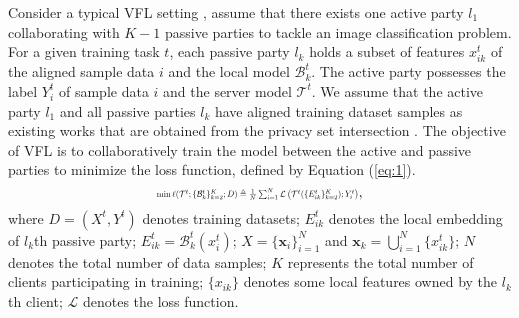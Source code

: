 Consider a typical VFL setting \cite{romanini2021pyvertical,liu2024vertical}, assume that there exists one active party $l_1$ collaborating with $K-1$ passive parties to tackle an image classification problem.
For a given training task $t$, each passive party $l_k$ holds a subset of features $x_{ik}^t$ of the aligned sample data $i$ and the local model $ \mathcal{B}_k^t$. 
The active party possesses the label $Y_{i}^{t}$ of sample data $i$ and the server model $\mathcal{T}^t$. 
We assume that the active party $l_1$ and all passive parties $l_k$ have aligned training dataset samples as existing works that are obtained from the privacy set intersection \cite{luo2021feature,zhang2022adaptive}.
The objective of VFL is to collaboratively train the model between the active and passive parties to minimize the loss function, defined by Equation (\ref{eq:1}).
%
%
\begin{equation} \label{eq:1}
\resizebox{0.42\textwidth}{!}{$
    \min\ell(\mathcal{T}^t; \{\mathcal{B}_k^t\}_{k = 2}^K; D) \triangleq \frac{1}{N} \sum_{i = 1}^{N} \mathcal{L} \left(\mathcal{T}^t(\{E_{ik}^t\}_{k = 2}^K); Y_{i}^{t}\right)$},
\end{equation} 
%
%
where $D = (X^t, Y^{t})$ denotes training datasets; $E_{ik}^{t}$ denotes the local embedding of $l_k$th passive party; $E_{ik}^{t} = \mathcal{B}_k^t(x_i^t)$;
$X = \{\mathbf{x}_{i}\}_{i = 1}^{N}$ and $\mathbf{x}_{k} = \bigcup_{i = 1}^{N} \{x_{ik}^t\}$; 
$N$ denotes the total number of data samples; 
$K$ represents the total number of clients participating in training; 
$\{x_{ik}\}$ denotes some local features owned by the $l_k$th client; 
$\mathcal{L}$ denotes the loss function. 


